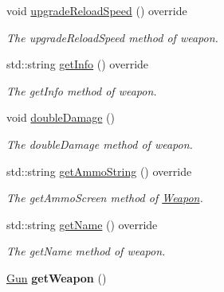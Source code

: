 \begin{DoxyCompactItemize}
void \hyperlink{class_gun_a88408d572350474609c2fc294a6b807b}{upgrade\+Reload\+Speed} () override
\begin{DoxyCompactList}\small\item\em The upgrade\+Reload\+Speed method of weapon. \end{DoxyCompactList}\item 
std\+::string \hyperlink{class_gun_a95d46c82be65c2552f3386f561e53bfb}{get\+Info} () override
\begin{DoxyCompactList}\small\item\em The get\+Info method of weapon. \end{DoxyCompactList}\item 
void \hyperlink{class_gun_a62ab15432407b2396c86d35264ea8a5b}{double\+Damage} ()
\begin{DoxyCompactList}\small\item\em The double\+Damage method of weapon. \end{DoxyCompactList}\item 
std\+::string \hyperlink{class_gun_a6c38ebbaf4b538bda73538c4125c663c}{get\+Ammo\+String} () override
\begin{DoxyCompactList}\small\item\em The get\+Ammo\+Screen method of \hyperlink{class_weapon}{Weapon}. \end{DoxyCompactList}\item 
std\+::string \hyperlink{class_gun_a7230d075015f04e59822b9078719c5d7}{get\+Name} () override
\begin{DoxyCompactList}\small\item\em The get\+Name method of weapon. \end{DoxyCompactList}\item 
\hypertarget{class_gun_a86d8b628b6ea7038834ce538bea5cf9b}{\hyperlink{class_gun}{Gun} {\bfseries get\+Weapon} ()}\label{class_gun_a86d8b628b6ea7038834ce538bea5cf9b}


\end{DoxyCompactItemize}
